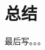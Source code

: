 \documentclass{article}
\begin{document}

%

\section{总结}
最后写。。。



\printbibliography[title={参考文献}]
\end{document}
